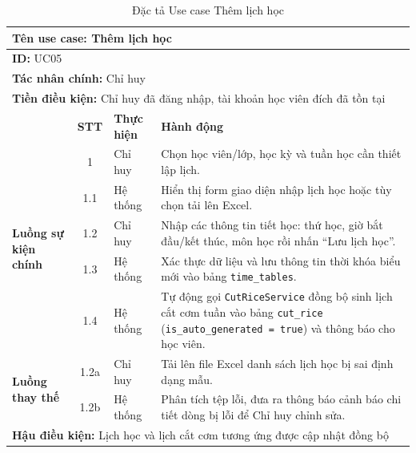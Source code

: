 \documentclass[../DoAn.tex]{subfiles}
\begin{document}
\begin{table}[H]
\centering
\small
\renewcommand{\arraystretch}{1.2}
\begin{tabular}{|p{2.2cm}|c|p{2cm}|p{8.5cm}|}
\hline
\multicolumn{4}{|l|}{\textbf{Tên use case:} Thêm lịch học} \\ \hline
\multicolumn{4}{|l|}{\textbf{ID:} UC05} \\ \hline
\multicolumn{4}{|l|}{\textbf{Tác nhân chính:} Chỉ huy} \\ \hline
\multicolumn{4}{|l|}{\textbf{Tiền điều kiện:} Chỉ huy đã đăng nhập, tài khoản học viên đích đã tồn tại} \\ \hline
 & \textbf{STT} & \textbf{Thực hiện} & \textbf{Hành động} \\ \hline
\multirow{5}{2.2cm}{\textbf{Luồng sự kiện chính}} 
& 1 & Chỉ huy & Chọn học viên/lớp, học kỳ và tuần học cần thiết lập lịch. \\ \cline{2-4}
& 1.1 & Hệ thống & Hiển thị form giao diện nhập lịch học hoặc tùy chọn tải lên Excel. \\ \cline{2-4}
& 1.2 & Chỉ huy & Nhập các thông tin tiết học: thứ học, giờ bắt đầu/kết thúc, môn học rồi nhấn ``Lưu lịch học''. \\ \cline{2-4}
& 1.3 & Hệ thống & Xác thực dữ liệu và lưu thông tin thời khóa biểu mới vào bảng \texttt{time\_tables}. \\ \cline{2-4}
& 1.4 & Hệ thống & Tự động gọi \texttt{CutRiceService} đồng bộ sinh lịch cắt cơm tuần vào bảng \texttt{cut\_rice} (\texttt{is\_auto\_generated = true}) và thông báo cho học viên. \\ \hline
\multirow{2}{2.2cm}{\textbf{Luồng thay thế}} 
& 1.2a & Chỉ huy & Tải lên file Excel danh sách lịch học bị sai định dạng mẫu. \\ \cline{2-4}
& 1.2b & Hệ thống & Phân tích tệp lỗi, đưa ra thông báo cảnh báo chi tiết dòng bị lỗi để Chỉ huy chỉnh sửa. \\ \hline
\multicolumn{4}{|l|}{\textbf{Hậu điều kiện:} Lịch học và lịch cắt cơm tương ứng được cập nhật đồng bộ} \\ \hline
\end{tabular}
\caption{Đặc tả Use case Thêm lịch học}
\label{table:uc_add_timetable}
\end{table}
\end{document}
